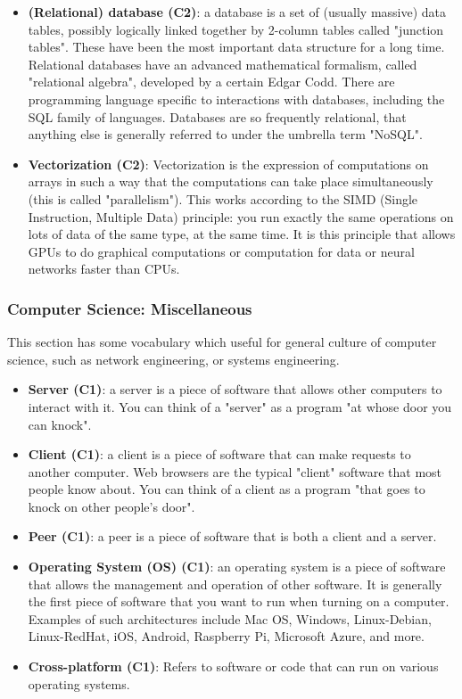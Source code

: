 \documentclass{article}
\begin{document}
\begin{itemize}
    \item \textbf{(Relational) database (C2)}: a database is a set of (usually massive) data tables, possibly logically linked together by 2-column tables called "junction tables". These have been the most important data structure for a long time. Relational databases have an advanced mathematical formalism, called "relational algebra", developed by a certain Edgar Codd. There are programming language specific to interactions with databases, including the SQL family of languages. Databases are so frequently relational, that anything else is generally referred to under the umbrella term "NoSQL".
    
    \item \textbf{Vectorization (C2)}: Vectorization is the expression of computations on arrays in such a way that the computations can take place simultaneously (this is called "parallelism"). This works according to the SIMD (Single Instruction, Multiple Data) principle: you run exactly the same operations on lots of data of the same type, at the same time. It is this principle that allows GPUs to do graphical computations or computation for data or neural networks faster than CPUs.
   
\end{itemize}


\subsubsection*{Computer Science: Miscellaneous}

This section has some vocabulary which useful for general culture of computer science, such as network engineering, or systems engineering.

\begin{itemize}	
    \item \textbf{Server (C1)}: a server is a piece of software that allows other computers to interact with it. You can think of a "server" as a program "at whose door you can knock".

    \item \textbf{Client (C1)}: a client is a piece of software that can make requests to another computer. Web browsers are the typical "client" software that most people know about. You can think of a client as a program "that goes to knock on other people's door". 

    \item \textbf{Peer (C1)}: a peer is a piece of software that is both a client and a server.

    \item \textbf{Operating System (OS) (C1)}: an operating system is a piece of software that allows the management and operation of other software. It is generally the first piece of software that you want to run when turning on a computer. Examples of such architectures include Mac OS, Windows, Linux-Debian, Linux-RedHat, iOS, Android, Raspberry Pi, Microsoft Azure, and more.

    \item \textbf{Cross-platform (C1)}: Refers to software or code that can run on various operating systems.
\end{itemize}
\end{document}
